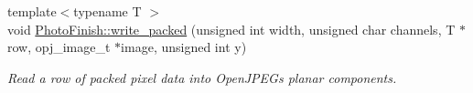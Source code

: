 \begin{DoxyCompactItemize}
{\footnotesize template$<$typename T $>$ }\\void \hyperlink{namespace_photo_finish_a5935e449413495c7af9504e518d0921b}{Photo\+Finish\+::write\+\_\+packed} (unsigned int width, unsigned char channels, T $\ast$row, opj\+\_\+image\+\_\+t $\ast$image, unsigned int y)
\begin{DoxyCompactList}\small\item\em Read a row of packed pixel data into Open\+J\+P\+EG\textquotesingle{}s planar components. \end{DoxyCompactList}\end{DoxyCompactItemize}
